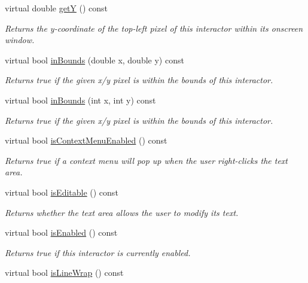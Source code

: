\begin{DoxyCompactItemize}
virtual double \mbox{\hyperlink{classsgl_1_1GInteractor_aafa51c7f8f38a09febbb9ce7853f77b4}{getY}} () const
\begin{DoxyCompactList}\small\item\em Returns the y-\/coordinate of the top-\/left pixel of this interactor within its onscreen window. \end{DoxyCompactList}\item 
virtual bool \mbox{\hyperlink{classsgl_1_1GInteractor_afc480f652b8c5f1fb255e2269ce68879}{in\+Bounds}} (double x, double y) const
\begin{DoxyCompactList}\small\item\em Returns true if the given x/y pixel is within the bounds of this interactor. \end{DoxyCompactList}\item 
virtual bool \mbox{\hyperlink{classsgl_1_1GInteractor_ae6d7982c1c627b677a5e776ca86118ed}{in\+Bounds}} (int x, int y) const
\begin{DoxyCompactList}\small\item\em Returns true if the given x/y pixel is within the bounds of this interactor. \end{DoxyCompactList}\item 
virtual bool \mbox{\hyperlink{classsgl_1_1GTextArea_a80f9fe3b6f725182b294886f57cc1689}{is\+Context\+Menu\+Enabled}} () const
\begin{DoxyCompactList}\small\item\em Returns true if a context menu will pop up when the user right-\/clicks the text area. \end{DoxyCompactList}\item 
virtual bool \mbox{\hyperlink{classsgl_1_1GTextArea_a012b5afb54e037e6c5498cf0932a521b}{is\+Editable}} () const
\begin{DoxyCompactList}\small\item\em Returns whether the text area allows the user to modify its text. \end{DoxyCompactList}\item 
virtual bool \mbox{\hyperlink{classsgl_1_1GInteractor_aacb819fb241851fd9fc045271baa4034}{is\+Enabled}} () const
\begin{DoxyCompactList}\small\item\em Returns true if this interactor is currently enabled. \end{DoxyCompactList}\item 
virtual bool \mbox{\hyperlink{classsgl_1_1GTextArea_ae09e72290b6e8a23bcc77752da6dffa5}{is\+Line\+Wrap}} () const

\end{DoxyCompactItemize}
